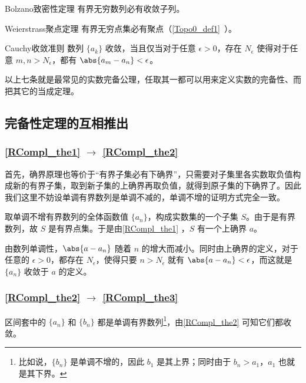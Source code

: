 \begin{theorem}{Bolzano致密性定理}\label{RCompl_the5}
有界无穷数列必有收敛子列。
\end{theorem}

\begin{theorem}{Weierstrass聚点定理}\label{RCompl_the6}
有界无穷点集必有聚点（\autoref{Topo0_def1}~）。
\end{theorem}

\begin{theorem}{Cauchy收敛准则}\label{RCompl_the7}
数列 $\{a_k\}$ 收敛，当且仅当对于任意 $\epsilon>0$，存在 $N_\epsilon$ 使得对于任意 $m, n>N_\epsilon$，都有 $\abs{a_m-a_n}<\epsilon$。
\end{theorem}

以上七条就是最常见的实数完备公理，任取其一都可以用来定义实数的完备性、而把其它的当成定理。

\subsection{完备性定理的互相推出}

\subsubsection{\autoref{RCompl_the1} $\to$ \autoref{RCompl_the2} }

首先，确界原理也等价于“有界子集必有下确界”，只需要对子集里各实数取负值构成新的有界子集，取到新子集的上确界再取负值，就得到原子集的下确界了。因此我们这里不妨设单调有界数列是单调不减的，单调不增的证明方式完全一致。

取单调不增有界数列的全体函数值 $\{a_n\}$，构成实数集的一个子集 $S$。由于是有界数列，故 $S$ 是有界点集。于是由\autoref{RCompl_the1} ，$S$ 有一个上确界 $a$。

由数列单调性，$\abs{a-a_n}$ 随着 $n$ 的增大而减小。同时由上确界的定义，对于任意的 $\epsilon>0$，都存在 $N_\epsilon$，使得只要 $n>N_\epsilon$ 就有 $\abs{a-a_n}<\epsilon$，而这就是 $\{a_n\}$ 收敛于 $a$ 的定义。

\subsubsection{\autoref{RCompl_the2} $\to$ \autoref{RCompl_the3} }

区间套中的 $\{a_n\}$ 和 $\{b_n\}$ 都是单调有界数列\footnote{比如说，$\{b_n\}$ 是单调不增的，因此 $b_1$ 是其上界；同时由于 $b_n>a_1$，$a_1$ 也就是其下界。}，由\autoref{RCompl_the2} 可知它们都收敛。


